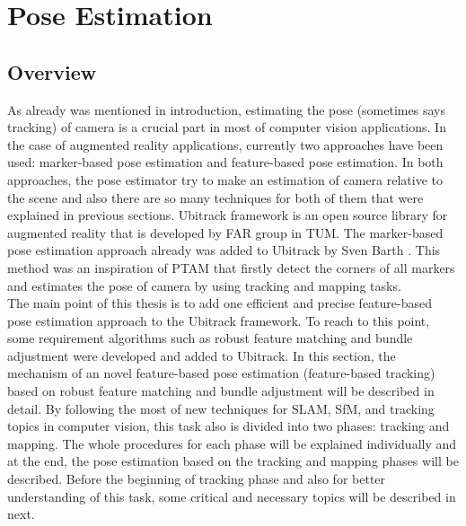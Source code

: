 \chapter{Pose Estimation}\label{chapter:pose_estimation}
\section{Overview}\label{sec:pose_estimation_overview}
As already was mentioned in introduction, estimating the pose (sometimes says tracking) of camera is a crucial part in most of computer vision applications. In the case of augmented reality applications, currently two approaches have been used: marker-based pose estimation and feature-based pose estimation. In both approaches, the pose estimator try to make an estimation of camera relative to the scene and also there are so many techniques for both of them that were explained in previous sections. Ubitrack framework is an open source library for augmented reality that is developed by FAR group in TUM. The marker-based pose estimation approach already was added to Ubitrack by Sven Barth \cite{barth2014marker}. This method was an inspiration of PTAM \cite{klein2007parallel} that firstly detect the corners of all markers and estimates the pose of camera by using tracking and mapping tasks.\\
The main point of this thesis is to add one efficient and precise feature-based pose estimation approach to the Ubitrack framework. To reach to this point, some requirement algorithms such as robust feature matching and bundle adjustment were developed and added to Ubitrack. In this section, the mechanism of an novel feature-based pose estimation (feature-based tracking) based on robust feature matching and bundle adjustment will be described in detail. By following the most of new techniques for SLAM, SfM, and tracking topics in computer vision, this task also is divided into two phases: tracking and mapping. The whole procedures for each phase will be explained individually and at the end, the pose estimation based on the tracking and mapping phases will be described. Before the beginning of tracking phase and also for better understanding of this task, some critical and necessary topics will be described in next.

